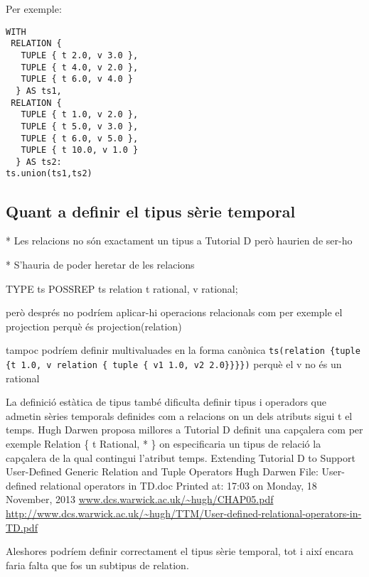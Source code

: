 Per exemple:
\begin{verbatim}
WITH 
 RELATION {
   TUPLE { t 2.0, v 3.0 },
   TUPLE { t 4.0, v 2.0 },
   TUPLE { t 6.0, v 4.0 }
  } AS ts1,
 RELATION {
   TUPLE { t 1.0, v 2.0 },
   TUPLE { t 5.0, v 3.0 },
   TUPLE { t 6.0, v 5.0 },
   TUPLE { t 10.0, v 1.0 }
  } AS ts2: 
ts.union(ts1,ts2)
\end{verbatim}










\subsection{Quant a definir el tipus sèrie temporal}
\label{sec:implementacio:tipus-relacional}

\todo{}

* Les relacions no són exactament un tipus a Tutorial D però haurien de ser-ho

* S'hauria de poder heretar de les relacions




TYPE ts POSSREP {ts relation {t rational, v rational}};

però després no podríem aplicar-hi operacions relacionals com per exemple el projection perquè és projection(relation)

tampoc podríem definir multivaluades en la forma canònica \verb+ts(relation {tuple {t 1.0, v relation { tuple { v1 1.0, v2 2.0}}}})+ perquè el v no és un rational






La definició estàtica de tipus també dificulta definir tipus i operadors que admetin sèries temporals definides com a relacions on un dels atributs sigui t el temps. Hugh Darwen proposa millores a Tutorial D definit una capçalera com per exemple Relation \{ t Rational, * \} on especificaria un tipus de relació la capçalera de la qual contingui l'atribut temps.
Extending Tutorial D to Support User-Defined
Generic Relation and Tuple Operators
Hugh Darwen
File: User-defined relational operators in TD.doc
Printed at: 17:03 on Monday, 18 November, 2013
\url{www.dcs.warwick.ac.uk/~hugh/CHAP05.pdf}
\url{http://www.dcs.warwick.ac.uk/~hugh/TTM/User-defined-relational-operators-in-TD.pdf}


Aleshores podríem definir correctament el tipus sèrie temporal, tot i així encara faria falta que fos un subtipus de relation.

